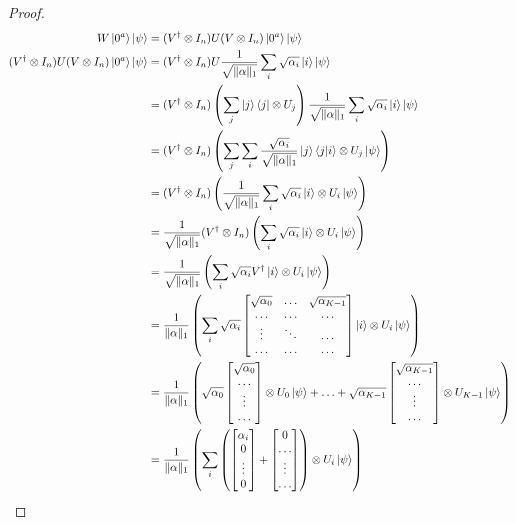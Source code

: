 \documentclass[12pt, oneside]{book}
\theoremstyle{definition}
\theoremstyle{definition}
\theoremstyle{remark}
\begin{document}
\begin{proof}
    \begin{align*}
    W\ket{0^a}\ket{\psi} &= (V^{\dagger} \otimes I_n)U(V\otimes I_n)\ket{0^a}\ket{\psi}\\
    (V^{\dagger} \otimes I_n)U(V\otimes I_n)\ket{0^a}\ket{\psi}&= (V^{\dagger} \otimes I_n)U\frac{1}{\sqrt{\|\alpha\|_1}}\sum_{i} \sqrt{\alpha_i} \ket{i}\ket{\psi}\\
    &=(V^{\dagger} \otimes I_n)\left(\sum_j \ket{j}\bra{j} \otimes U_j \right) \frac{1}{\sqrt{\|\alpha\|_1}}\sum_i \sqrt{\alpha_i}\ket{i}\ket{\psi}\\
    &=(V^{\dagger} \otimes I_n) \left( \sum_j \sum_i \frac{\sqrt{\alpha_i}}{\sqrt{\|\alpha\|_1}} \ket{j}\braket{j|i} \otimes U_j\ket{\psi}\right)\\
    &= (V^{\dagger} \otimes I_n) \left(\frac{1}{\sqrt{\|\alpha\|_1}}\sum_i {\sqrt{\alpha_i}} \ket{i} \otimes U_i\ket{\psi}\right)\\
    &=\frac{1}{\sqrt{\|\alpha\|_1}}(V^{\dagger}\otimes I_n)\left(\sum_i \sqrt{\alpha_i} \ket{i} \otimes U_i\ket{\psi} \right)\\
    &=\frac{1}{\sqrt{\|\alpha\|_1}}\left(\sum_i \sqrt{\alpha_i} V^{\dagger}\ket{i} \otimes U_i\ket{\psi}\right)\\
    &=\frac{1}{\|\alpha\|_1} \left(\sum_i \sqrt{\alpha_i} \begin{bmatrix} \sqrt{\alpha_0} & \ldots & \sqrt{\alpha_{K-1}} \\
\ldots & \ldots & \ldots \\
\vdots & \ddots & \ldots \\
\ldots & \ldots & \ldots \end{bmatrix} \ket{i} \otimes U_i\ket{\psi}\right)\\
&=\frac{1}{\|\alpha\|_1}\left(\sqrt{\alpha_0}\begin{bmatrix} \sqrt{\alpha_0} \\ \ldots \\ \vdots \\ \ldots \end{bmatrix}  \otimes U_0\ket{\psi}+\ldots + \sqrt{\alpha_{K-1}} \begin{bmatrix}\sqrt{\alpha_{K-1}} \\ \ldots \\ \vdots \\ \ldots \end{bmatrix} \otimes U_{K-1}\ket{\psi}\right)\\
&=\frac{1}{\|\alpha\|_1}\left(\sum_i \left(\begin{bmatrix} \alpha_i \\ 0 \\ \vdots \\ 0 \end{bmatrix} + \begin{bmatrix} 0 \\ \ldots \\ \vdots \\ \ldots \end{bmatrix}\right) \otimes U_i\ket{\psi} \right)\\

\end{align*}
\end{proof}
\end{document}
